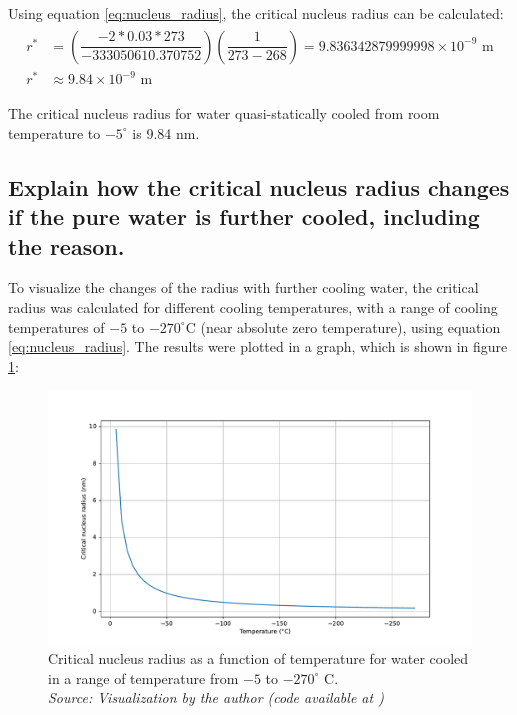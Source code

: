 Using equation \ref{eq:nucleus_radius}, the critical nucleus radius can be calculated:
\begin{align}
  \label{eq:radius}
  \begin{split}
    r^*&=\left(\dfrac{-2*0.03*273}{-333050610.370752}\right)\left(\dfrac{1}{273-268}\right)=9.836342879999998\times 10^{-9}\text{ m} \\ 
    r^*&\approx 9.84\times 10^{-9} \text{ m}
  \end{split}
\end{align}

\begin{mdframed}
The critical nucleus radius for water quasi-statically cooled from room temperature to $-5^{\circ}$ is 9.84 nm.
\end{mdframed}

\subsection{Explain how the critical nucleus radius changes if the pure water is
further cooled, including the reason.}

To visualize the changes of the radius with further cooling water, the critical radius was calculated for different cooling temperatures, with a range of cooling temperatures of $-5$ to $-270^{\circ}$C (near absolute zero temperature), using equation \ref{eq:nucleus_radius}. The results were plotted in a graph, which is shown in figure \ref{fig:critical_radius}:

\begin{figure}[h]
    \centering
    \includegraphics[width=1\textwidth]{graficas/critical_radius.pdf}
    \caption{Critical nucleus radius as a function of temperature for water cooled in a range of temperature from $-5$ to $-270^{\circ}$ C. \\
    \textit{Source: Visualization by the author (code available at \citet{mygit})}}
    \label{fig:critical_radius}
\end{figure}

